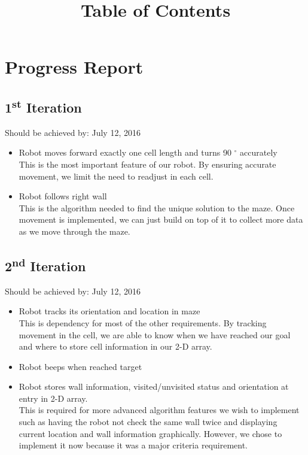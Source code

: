 \documentclass[11pt]{article}
\date{}
\title{Table of Contents}
\newcommand{\ts}{\textsuperscript}
\begin{document}
\maketitle

\tableofcontents

\newpage




\section{Progress Report}
\subsection{1\ts{st} Iteration}
Should be achieved by: July 12, 2016
\begin{itemize}
\item Robot moves forward exactly one cell length and turns 90 $^{\circ}$ accurately\\
This is the most important feature of our robot. By ensuring accurate movement, we limit the need to readjust in each cell.
\item Robot follows right wall\\
This is the algorithm needed to find the unique solution to the maze. Once movement is implemented, we can just build on top of it to collect more data as we move through the maze. 
\end{itemize}

\subsection{2\ts{nd} Iteration}
Should be achieved by: July 12, 2016
\begin{itemize}
\item Robot tracks its orientation and location in maze\\
This is dependency for most of the other requirements. By tracking movement in the cell, we are able to know when we have reached our goal and where to store cell information in our 2-D array.
\item Robot beeps when reached target
\item Robot stores wall information, visited/unvisited status and orientation at entry in 2-D array.\\
This is required for more advanced algorithm features we wish to implement such as having the robot not check the same wall twice and displaying current location and wall information graphically. However, we chose to implement it now because it was a major criteria requirement. 
\end{itemize}
\end{document}
